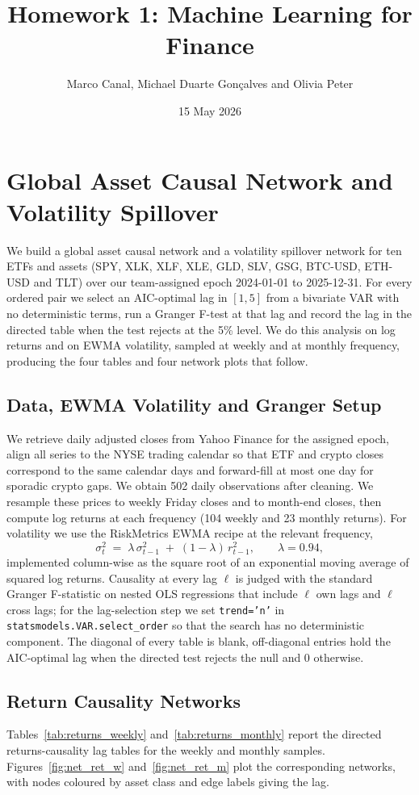 \documentclass[12pt,a4paper]{article}
\title{Homework 1: Machine Learning for Finance}
\author{Marco Canal, Michael Duarte Gonçalves and Olivia Peter}
\date{15 May 2026}
\makeatletter
\newcommand{\probsection}[2]{\section{#2}}
\newcommand{\probsub}[2]{\subsection{#2}}
\newcommand{\code}[1]{\texttt{#1}}
\renewcommand{\maketitle}{%
  \begin{center}
  {\Large \@title\par}
  \vspace{0.35em}
  {\fontsize{11pt}{13.2pt}\selectfont \@author\par}
  \vspace{0.15em}
  {\@date\par}
  \end{center}
  \vspace{0.7em}}
\makeatother
\begin{document}
\maketitle
\vspace{0.2em}

\probsection{1}{Global Asset Causal Network and Volatility Spillover}

We build a global asset causal network and a volatility spillover network for ten ETFs and assets (SPY, XLK, XLF, XLE, GLD, SLV, GSG, BTC-USD, ETH-USD and TLT) over our team-assigned epoch 2024-01-01 to 2025-12-31. For every ordered pair we select an AIC-optimal lag in $[1,5]$ from a bivariate VAR with no deterministic terms, run a Granger F-test at that lag and record the lag in the directed table when the test rejects at the 5\% level. We do this analysis on log returns and on EWMA volatility, sampled at weekly and at monthly frequency, producing the four tables and four network plots that follow.

\probsub{1a}{Data, EWMA Volatility and Granger Setup}

We retrieve daily adjusted closes from Yahoo Finance for the assigned epoch, align all series to the NYSE trading calendar so that ETF and crypto closes correspond to the same calendar days and forward-fill at most one day for sporadic crypto gaps. We obtain 502 daily observations after cleaning. We resample these prices to weekly Friday closes and to month-end closes, then compute log returns at each frequency (104 weekly and 23 monthly returns). For volatility we use the RiskMetrics EWMA recipe at the relevant frequency,
\[
\sigma_t^2 \;=\; \lambda \, \sigma_{t-1}^2 \;+\; (1-\lambda)\, r_{t-1}^2,
\qquad \lambda = 0.94,
\]
implemented column-wise as the square root of an exponential moving average of squared log returns. Causality at every lag $\ell$ is judged with the standard Granger F-statistic on nested OLS regressions that include $\ell$ own lags and $\ell$ cross lags; for the lag-selection step we set \code{trend='n'} in \code{statsmodels.VAR.select\_order} so that the search has no deterministic component. The diagonal of every table is blank, off-diagonal entries hold the AIC-optimal lag when the directed test rejects the null and 0 otherwise.

\probsub{1b}{Return Causality Networks}

Tables~\ref{tab:returns_weekly} and~\ref{tab:returns_monthly} report the directed returns-causality lag tables for the weekly and monthly samples. Figures~\ref{fig:net_ret_w} and~\ref{fig:net_ret_m} plot the corresponding networks, with nodes coloured by asset class and edge labels giving the lag.
\end{document}
